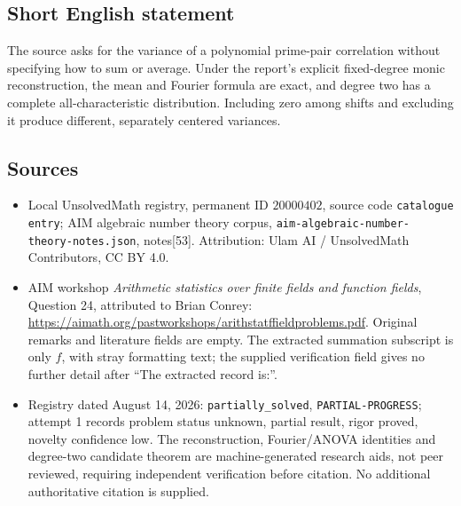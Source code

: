 \documentclass[11pt]{article}
\begin{document}
\subsection{Short English statement}
The source asks for the variance of a polynomial prime-pair correlation without specifying how to sum or average. Under the report's explicit fixed-degree monic reconstruction, the mean and Fourier formula are exact, and degree two has a complete all-characteristic distribution. Including zero among shifts and excluding it produce different, separately centered variances.
\subsection{Sources}
\begin{itemize}
\item Local UnsolvedMath registry, permanent ID \(20000402\), source code \texttt{catalogue entry}; AIM algebraic number theory corpus, \texttt{aim-algebraic-number-theory-notes.json}, notes[53]. Attribution: Ulam AI / UnsolvedMath Contributors, CC BY 4.0.
\item AIM workshop \emph{Arithmetic statistics over finite fields and function fields}, Question 24, attributed to Brian Conrey: \url{https://aimath.org/pastworkshops/arithstatffieldproblems.pdf}. Original remarks and literature fields are empty. The extracted summation subscript is only \(f\), with stray formatting text; the supplied verification field gives no further detail after ``The extracted record is:''.
\item Registry dated August 14, 2026: \texttt{partially\_solved}, \texttt{PARTIAL-PROGRESS}; attempt 1 records problem status unknown, partial result, rigor proved, novelty confidence low. The reconstruction, Fourier/ANOVA identities and degree-two candidate theorem are machine-generated research aids, not peer reviewed, requiring independent verification before citation. No additional authoritative citation is supplied.
\end{itemize}
\end{document}
